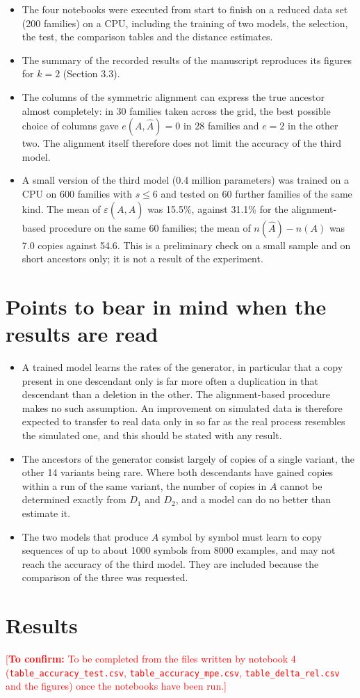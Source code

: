 \documentclass[11pt,a4paper]{article}
\newcommand{\todo}[1]{\textcolor{red}{[\textbf{To confirm:} #1]}}
\newcommand{\Ahat}{\hat{A}}
\begin{document}
\begin{itemize}
\item The four notebooks were executed from start to finish on a reduced data set (200 families) on a CPU, including the training of two models, the selection, the test, the comparison tables and the distance estimates.
\item The summary of the recorded results of the manuscript reproduces its figures for $k=2$ (Section 3.3).
\item The columns of the symmetric alignment can express the true ancestor almost completely: in 30 families taken across the grid, the best possible choice of columns gave $e(A,\Ahat)=0$ in 28 families and $e=2$ in the other two. The alignment itself therefore does not limit the accuracy of the third model.
\item A small version of the third model (0.4 million parameters) was trained on a CPU on 600 families with $s\le 6$ and tested on 60 further families of the same kind. The mean of $\varepsilon(A,\Ahat)$ was 15.5\%, against 31.1\% for the alignment-based procedure on the same 60 families; the mean of $n(\Ahat)-n(A)$ was 7.0 copies against 54.6. This is a preliminary check on a small sample and on short ancestors only; it is not a result of the experiment.
\end{itemize}

\section{Points to bear in mind when the results are read}

\begin{itemize}
\item A trained model learns the rates of the generator, in particular that a copy present in one descendant only is far more often a duplication in that descendant than a deletion in the other. The alignment-based procedure makes no such assumption. An improvement on simulated data is therefore expected to transfer to real data only in so far as the real process resembles the simulated one, and this should be stated with any result.
\item The ancestors of the generator consist largely of copies of a single variant, the other 14 variants being rare. Where both descendants have gained copies within a run of the same variant, the number of copies in $A$ cannot be determined exactly from $D_1$ and $D_2$, and a model can do no better than estimate it.
\item The two models that produce $A$ symbol by symbol must learn to copy sequences of up to about 1000 symbols from 8000 examples, and may not reach the accuracy of the third model. They are included because the comparison of the three was requested.
\end{itemize}

\section{Results}

\todo{To be completed from the files written by notebook 4 (\texttt{table\_accuracy\_test.csv}, \texttt{table\_accuracy\_mpe.csv}, \texttt{table\_delta\_rel.csv} and the figures) once the notebooks have been run.}
\end{document}
